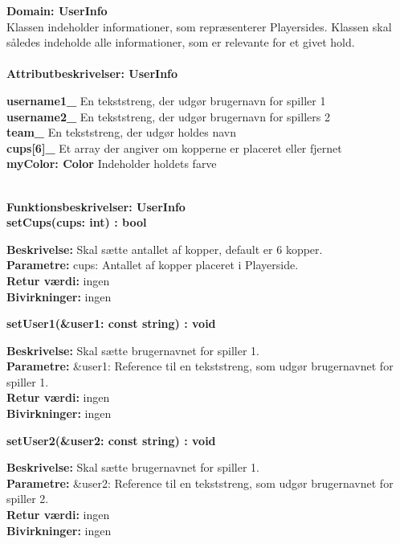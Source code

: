 \documentclass[Arkitektur/System_main.tex]{subfiles}
\begin{document}
{\large\textbf{Domain: UserInfo}}\\
Klassen indeholder informationer, som repræsenterer Playersides. Klassen skal således indeholde alle informationer, som er relevante for et givet hold.\\
\\{\large\textbf{Attributbeskrivelser: UserInfo}}
\begin{adjustwidth}{1cm}{0pt}
\textbf{username1\_} En tekststreng, der udgør brugernavn for spiller 1 \\[0.2cm]
\textbf{username2\_} En tekststreng, der udgør brugernavn for spillers 2 \\[0.2cm]
\textbf{team\_} En tekststreng, der udgør holdes navn \\[0.2cm]
\textbf{cups[6]\_} Et array der angiver om kopperne er placeret eller fjernet  \\[0.2cm]
\textbf{myColor: Color} Indeholder holdets farve  \\[0.2cm]
\end{adjustwidth}
\\
{\large\textbf{Funktionsbeskrivelser: UserInfo}}\\[0.2cm]
\textbf{setCups(cups: int) : bool}
\begin{adjustwidth}{1cm}{0pt}
\textbf{Beskrivelse:} Skal sætte antallet af kopper, default er 6 kopper.\\
\textbf{Parametre:} cups: Antallet af kopper placeret i Playerside. \\[0.2cm]
\textbf{Retur værdi:} ingen \\[0.2cm]
\textbf{Bivirkninger:} ingen \\[0.2cm]
\end{adjustwidth}

\textbf{setUser1(&user1: const string) : void}
\begin{adjustwidth}{1cm}{0pt}
\textbf{Beskrivelse:} Skal sætte brugernavnet for spiller 1.\\
\textbf{Parametre:} &user1: Reference til en tekststreng, som udgør brugernavnet for spiller 1. \\[0.2cm]
\textbf{Retur værdi:} ingen \\[0.2cm]
\textbf{Bivirkninger:} ingen \\[0.2cm]
\end{adjustwidth}

\textbf{setUser2(&user2: const string) : void}
\begin{adjustwidth}{1cm}{0pt}
\textbf{Beskrivelse:} Skal sætte brugernavnet for spiller 1.\\
\textbf{Parametre:} &user2: Reference til en tekststreng, som udgør brugernavnet for spiller 2. \\[0.2cm]
\textbf{Retur værdi:} ingen \\[0.2cm]
\textbf{Bivirkninger:} ingen \\[0.2cm]
\end{adjustwidth}
\end{document}
